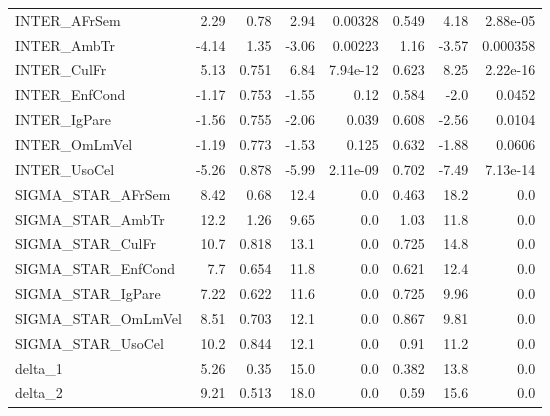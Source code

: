 \begin{tabular}{lrrrrrrr}
INTER\_AFrSem       &   2.29 &     0.78 &    2.94 &  0.00328 &         0.549 &         4.18 &      2.88e-05 \\
INTER\_AmbTr        &  -4.14 &     1.35 &   -3.06 &  0.00223 &          1.16 &        -3.57 &      0.000358 \\
INTER\_CulFr        &   5.13 &    0.751 &    6.84 & 7.94e-12 &         0.623 &         8.25 &      2.22e-16 \\
INTER\_EnfCond      &  -1.17 &    0.753 &   -1.55 &     0.12 &         0.584 &         -2.0 &        0.0452 \\
INTER\_IgPare       &  -1.56 &    0.755 &   -2.06 &    0.039 &         0.608 &        -2.56 &        0.0104 \\
INTER\_OmLmVel      &  -1.19 &    0.773 &   -1.53 &    0.125 &         0.632 &        -1.88 &        0.0606 \\
INTER\_UsoCel       &  -5.26 &    0.878 &   -5.99 & 2.11e-09 &         0.702 &        -7.49 &      7.13e-14 \\
SIGMA\_STAR\_AFrSem  &   8.42 &     0.68 &    12.4 &      0.0 &         0.463 &         18.2 &           0.0 \\
SIGMA\_STAR\_AmbTr   &   12.2 &     1.26 &    9.65 &      0.0 &          1.03 &         11.8 &           0.0 \\
SIGMA\_STAR\_CulFr   &   10.7 &    0.818 &    13.1 &      0.0 &         0.725 &         14.8 &           0.0 \\
SIGMA\_STAR\_EnfCond &    7.7 &    0.654 &    11.8 &      0.0 &         0.621 &         12.4 &           0.0 \\
SIGMA\_STAR\_IgPare  &   7.22 &    0.622 &    11.6 &      0.0 &         0.725 &         9.96 &           0.0 \\
SIGMA\_STAR\_OmLmVel &   8.51 &    0.703 &    12.1 &      0.0 &         0.867 &         9.81 &           0.0 \\
SIGMA\_STAR\_UsoCel  &   10.2 &    0.844 &    12.1 &      0.0 &          0.91 &         11.2 &           0.0 \\
delta\_1            &   5.26 &     0.35 &    15.0 &      0.0 &         0.382 &         13.8 &           0.0 \\
delta\_2            &   9.21 &    0.513 &    18.0 &      0.0 &          0.59 &         15.6 &           0.0 \\
\bottomrule
\end{tabular}

